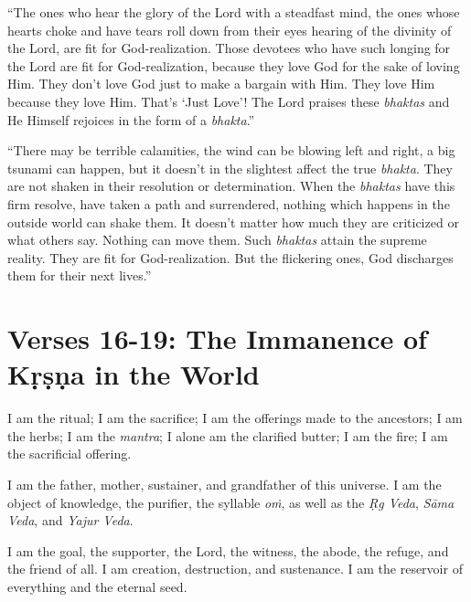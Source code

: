 \enquote{The ones who hear the glory of the Lord with a steadfast mind, the ones whose hearts choke and have tears roll down from their eyes hearing of the divinity of the Lord, are fit for God-realization. Those devotees who have such longing for the Lord are fit for God-realization, because they love God for the sake of loving Him. They don’t love God just to make a bargain with Him. They love Him because they love Him. That’s \enquote{Just Love}! The Lord praises these \textit{bhaktas} and He Himself rejoices in the form of a \textit{bhakta}.}

\enquote{There may be terrible calamities, the wind can be blowing left and right, a big tsunami can happen, but it doesn’t in the slightest affect the true \textit{bhakta}. They are not shaken in their resolution or determination. When the \textit{bhaktas} have this firm resolve, have taken a path and surrendered, nothing which happens in the outside world can shake them. It doesn’t matter how much they are criticized or what others say. Nothing can move them. Such \textit{bhaktas} attain the supreme reality. They are fit for God-realization. But the flickering ones, God discharges them for their next lives.}

\section{Verses 16-19: The Immanence of Kṛṣṇa in the World}\label{sec-verses-16-19-the-immanence-of-krsna-in-the-world}

{I am the ritual; I am the sacrifice; I am the offerings made to the ancestors; I am the herbs; I am the \textit{mantra}; I alone am the clarified butter; I am the fire; I am the sacrificial offering.}

{I am the father, mother, sustainer, and grandfather of this universe. I am the object of knowledge, the purifier, the syllable \textit{oṁ}, as well as the \textit{Ṛg Veda}, \textit{Sāma Veda}, and \textit{Yajur Veda}.}

{I am the goal, the supporter, the Lord, the witness, the abode, the refuge, and the friend of all. I am creation, destruction, and sustenance. I am the reservoir of everything and the eternal seed.}

